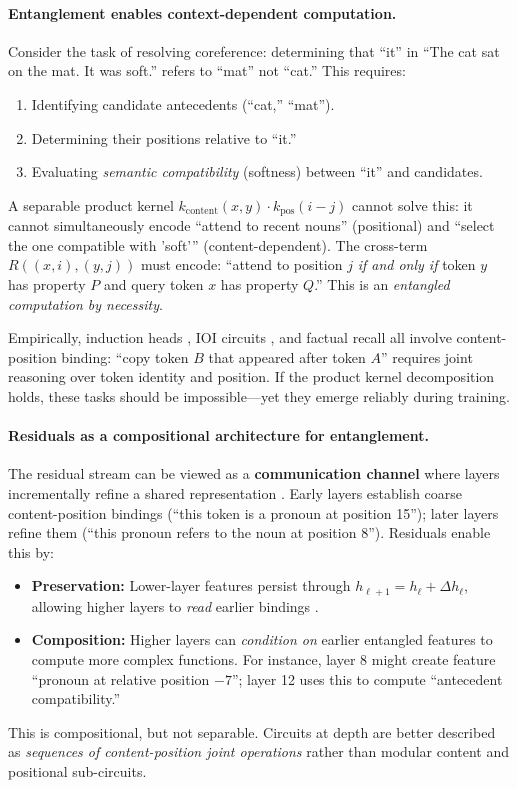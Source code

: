 \documentclass[11pt]{article}
\theoremstyle{definition}
\begin{document}
\paragraph{Entanglement enables context-dependent computation.}
Consider the task of resolving coreference: determining that ``it'' in ``The cat sat on the mat. It was soft.'' refers to ``mat'' not ``cat.'' This requires:
\begin{enumerate}
    \item Identifying candidate antecedents (``cat,'' ``mat'').
    \item Determining their positions relative to ``it.''
    \item Evaluating \emph{semantic compatibility} (softness) between ``it'' and candidates.
\end{enumerate}
A separable product kernel $k_{\text{content}}(x,y) \cdot k_{\text{pos}}(i-j)$ cannot solve this: it cannot simultaneously encode ``attend to recent nouns'' (positional) and ``select the one compatible with 'soft'\thinspace'' (content-dependent). The cross-term $R((x,i),(y,j))$ must encode: ``attend to position $j$ \emph{if and only if} token $y$ has property $P$ and query token $x$ has property $Q$.'' This is an \emph{entangled computation by necessity}.

Empirically, induction heads \cite{olsson2022induction}, IOI circuits \cite{wang2023interpretability}, and factual recall \cite{geva2021mlp} all involve content-position binding: ``copy token $B$ that appeared after token $A$'' requires joint reasoning over token identity and position. If the product kernel decomposition holds, these tasks should be impossible---yet they emerge reliably during training.

\paragraph{Residuals as a compositional architecture for entanglement.}
The residual stream can be viewed as a \textbf{communication channel} where layers incrementally refine a shared representation \cite{elhage2023superposition,nostalgebraist2020logit}. Early layers establish coarse content-position bindings (``this token is a pronoun at position 15''); later layers refine them (``this pronoun refers to the noun at position 8''). Residuals enable this by:
\begin{itemize}
    \item \textbf{Preservation:} Lower-layer features persist through $h_{\ell+1} = h_\ell + \Delta h_\ell$, allowing higher layers to \emph{read} earlier bindings \cite{dosovitskiy2021vit,raghu2021vit}.
    \item \textbf{Composition:} Higher layers can \emph{condition on} earlier entangled features to compute more complex functions. For instance, layer 8 might create feature ``pronoun at relative position $-7$''; layer 12 uses this to compute ``antecedent compatibility.''
\end{itemize}
This is compositional, but not separable. Circuits at depth are better described as \emph{sequences of content-position joint operations} rather than modular content and positional sub-circuits.
\end{document}
